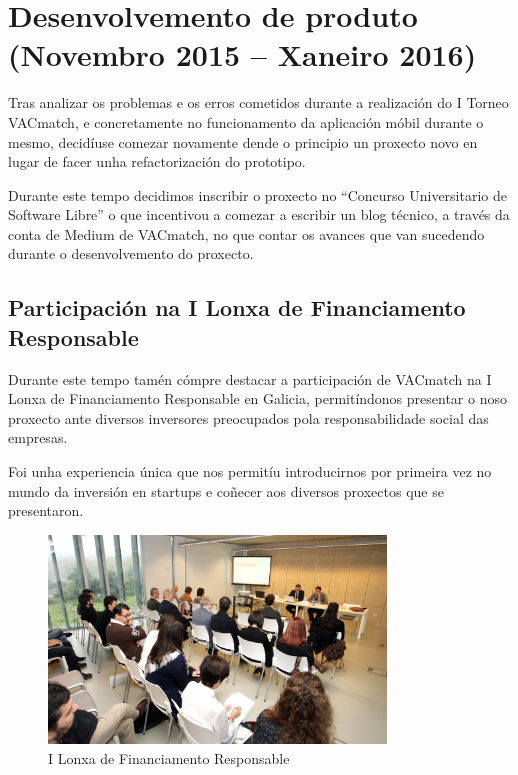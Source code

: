   \section{Desenvolvemento de produto (Novembro 2015 -- Xaneiro 2016)}
  Tras analizar os problemas e os erros cometidos durante a realización do I 
Torneo VACmatch, e concretamente no funcionamento da aplicación móbil durante o 
mesmo, decidíuse comezar novamente dende o principio un proxecto novo en lugar 
de facer unha refactorización do prototipo.

    Durante este tempo decidimos inscribir o proxecto no ``Concurso 
Universitario de Software Libre'' o que incentivou a comezar a escribir un 
blog técnico, a través da conta de Medium de VACmatch, no que contar os avances 
que van sucedendo durante o desenvolvemento do proxecto.

    \subsection{Participación na I Lonxa de Financiamento Responsable}
    Durante este tempo tamén cómpre destacar a participación de VACmatch na I 
Lonxa de Financiamento Responsable en Galicia, permitíndonos presentar o noso 
proxecto ante diversos inversores preocupados pola responsabilidade social das 
empresas.

    Foi unha experiencia única que nos permitíu introducirnos por primeira vez 
no mundo da inversión en startups e coñecer aos diversos proxectos que se 
presentaron.

    \begin{figure}[h!]
          \begin{center}
          \includegraphics[width=0.8\textwidth]{./img/inversion_responsable.jpg}
          \caption{I Lonxa de Financiamento Responsable}
          \end{center}
    \end{figure}

